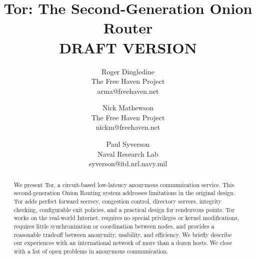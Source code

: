 \documentclass[times,10pt,twocolumn]{article}
\begin{document}

\title{Tor: The Second-Generation Onion Router\\DRAFT VERSION}

\author{Roger Dingledine \\ The Free Haven Project \\ arma@freehaven.net \and
Nick Mathewson \\ The Free Haven Project \\ nickm@freehaven.net \and
Paul Syverson \\ Naval Research Lab \\ syverson@itd.nrl.navy.mil}

\maketitle
\thispagestyle{empty}

\begin{abstract}
We present Tor, a circuit-based low-latency anonymous communication
service. This second-generation Onion Routing system addresses limitations
in the original design. Tor adds perfect forward secrecy, congestion
control, directory servers, integrity checking, configurable exit policies,
and a practical design for rendezvous points. Tor works on the real-world
Internet, requires no special privileges or kernel modifications, requires
little synchronization or coordination between nodes, and provides a
reasonable tradeoff between anonymity, usability, and efficiency.
We briefly describe our experiences with an international network of
more than a dozen hosts. %
We close with a list of open problems in anonymous communication.
\end{abstract}



\label{sec:intro}
\end{document}
